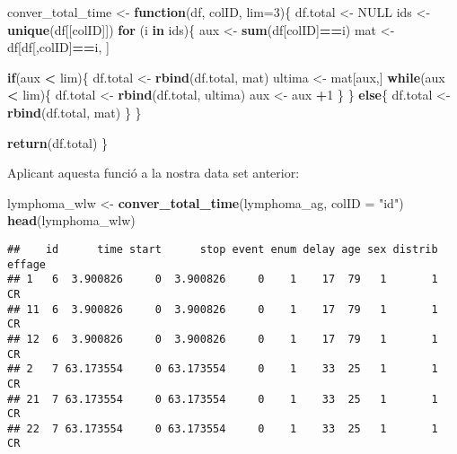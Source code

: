 \documentclass[
]{article}
\newenvironment{Shaded}{\begin{snugshade}}{\end{snugshade}}
\newcommand{\AttributeTok}[1]{\textcolor[rgb]{0.13,0.29,0.53}{#1}}
\newcommand{\ConstantTok}[1]{\textcolor[rgb]{0.56,0.35,0.01}{#1}}
\newcommand{\ControlFlowTok}[1]{\textcolor[rgb]{0.13,0.29,0.53}{\textbf{#1}}}
\newcommand{\DecValTok}[1]{\textcolor[rgb]{0.00,0.00,0.81}{#1}}
\newcommand{\FunctionTok}[1]{\textcolor[rgb]{0.13,0.29,0.53}{\textbf{#1}}}
\newcommand{\NormalTok}[1]{#1}
\newcommand{\OtherTok}[1]{\textcolor[rgb]{0.56,0.35,0.01}{#1}}
\newcommand{\SpecialCharTok}[1]{\textcolor[rgb]{0.81,0.36,0.00}{\textbf{#1}}}
\newcommand{\StringTok}[1]{\textcolor[rgb]{0.31,0.60,0.02}{#1}}
\begin{document}
\begin{Shaded}
\begin{Highlighting}[]
\NormalTok{conver\_total\_time }\OtherTok{\textless{}{-}} \ControlFlowTok{function}\NormalTok{(df, colID, }\AttributeTok{lim=}\DecValTok{3}\NormalTok{)\{}
\NormalTok{  df.total }\OtherTok{\textless{}{-}} \ConstantTok{NULL}
\NormalTok{  ids }\OtherTok{\textless{}{-}} \FunctionTok{unique}\NormalTok{(df[[colID]])}
  \ControlFlowTok{for}\NormalTok{ (i }\ControlFlowTok{in}\NormalTok{ ids)\{}
\NormalTok{    aux }\OtherTok{\textless{}{-}} \FunctionTok{sum}\NormalTok{(df[colID]}\SpecialCharTok{==}\NormalTok{i)}
\NormalTok{    mat }\OtherTok{\textless{}{-}}\NormalTok{ df[df[,colID]}\SpecialCharTok{==}\NormalTok{i, ]}
    
    \ControlFlowTok{if}\NormalTok{(aux }\SpecialCharTok{\textless{}}\NormalTok{ lim)\{}
\NormalTok{      df.total }\OtherTok{\textless{}{-}} \FunctionTok{rbind}\NormalTok{(df.total, mat)}
\NormalTok{      ultima }\OtherTok{\textless{}{-}}\NormalTok{ mat[aux,]}
      \ControlFlowTok{while}\NormalTok{(aux }\SpecialCharTok{\textless{}}\NormalTok{ lim)\{}
\NormalTok{        df.total }\OtherTok{\textless{}{-}} \FunctionTok{rbind}\NormalTok{(df.total, ultima)}
\NormalTok{        aux }\OtherTok{\textless{}{-}}\NormalTok{ aux }\SpecialCharTok{+}\DecValTok{1}
\NormalTok{      \}}
\NormalTok{    \} }\ControlFlowTok{else}\NormalTok{\{}
\NormalTok{      df.total }\OtherTok{\textless{}{-}} \FunctionTok{rbind}\NormalTok{(df.total, mat)}
\NormalTok{    \}}
\NormalTok{  \}}
  
  \FunctionTok{return}\NormalTok{(df.total)}
\NormalTok{\}}
\end{Highlighting}
\end{Shaded}

Aplicant aquesta funció a la nostra data set anterior:

\begin{Shaded}
\begin{Highlighting}[]
\NormalTok{lymphoma\_wlw }\OtherTok{\textless{}{-}} \FunctionTok{conver\_total\_time}\NormalTok{(lymphoma\_ag, }\AttributeTok{colID =} \StringTok{"id"}\NormalTok{)}
\FunctionTok{head}\NormalTok{(lymphoma\_wlw)}
\end{Highlighting}
\end{Shaded}

\begin{verbatim}
##    id      time start      stop event enum delay age sex distrib effage
## 1   6  3.900826     0  3.900826     0    1    17  79   1       1     CR
## 11  6  3.900826     0  3.900826     0    1    17  79   1       1     CR
## 12  6  3.900826     0  3.900826     0    1    17  79   1       1     CR
## 2   7 63.173554     0 63.173554     0    1    33  25   1       1     CR
## 21  7 63.173554     0 63.173554     0    1    33  25   1       1     CR
## 22  7 63.173554     0 63.173554     0    1    33  25   1       1     CR
\end{verbatim}
\end{document}
